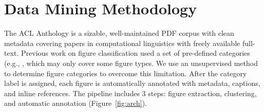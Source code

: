 \documentclass{article}
\begin{document}
\section{Data Mining Methodology}
The ACL Anthology is a sizable, well-maintained PDF corpus with clean metadata covering papers in computational linguistics with freely available full-text. Previous work on figure classification used a set of pre-defined categories (e.g., \cite{kahou2018figureqa}, which may only cover some figure types.  We use an unsupervised method to determine figure categories to overcome this limitation. After the category label is assigned, each figure is automatically annotated with metadata, captions, and inline references. The pipeline includes 3 steps: figure extraction,  clustering, and automatic annotation (Figure~\ref{fig:arch}).
\end{document}
